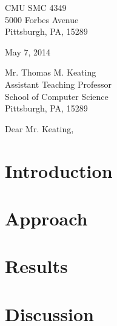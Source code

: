 \documentclass{article}
\begin{document}
\noindent
CMU SMC 4349\\
5000 Forbes Avenue\\
Pittsburgh, PA, 15289

\vspace{1em}

\noindent
May 7, 2014

\vspace{1em}

\noindent
Mr. Thomas M. Keating\\
Assistant Teaching Professor\\
School of Computer Science\\
Pittsburgh, PA, 15289

\vspace{1em}

\noindent
Dear Mr. Keating,


\vspace{1em}



\tableofcontents

\section{Introduction}

\section{Approach}

\section{Results}

\section{Discussion}

\end{document}
